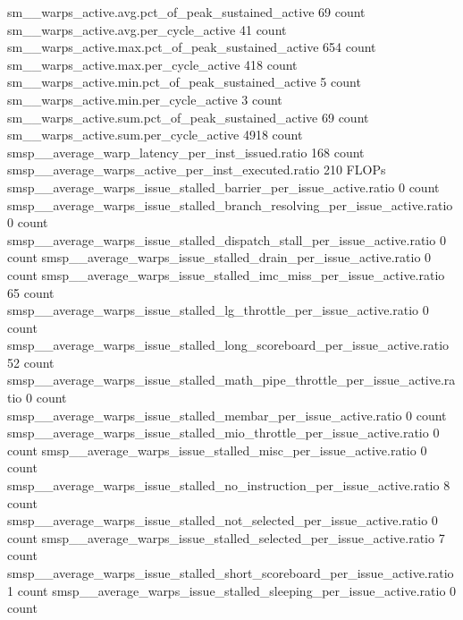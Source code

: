 sm__warps_active.avg.pct_of_peak_sustained_active                                             69 count
sm__warps_active.avg.per_cycle_active                                                         41 count
sm__warps_active.max.pct_of_peak_sustained_active                                            654 count
sm__warps_active.max.per_cycle_active                                                        418 count
sm__warps_active.min.pct_of_peak_sustained_active                                              5 count
sm__warps_active.min.per_cycle_active                                                          3 count
sm__warps_active.sum.pct_of_peak_sustained_active                                             69 count
sm__warps_active.sum.per_cycle_active                                                       4918 count
smsp__average_warp_latency_per_inst_issued.ratio                                             168 count
smsp__average_warps_active_per_inst_executed.ratio                                           210 FLOPs
smsp__average_warps_issue_stalled_barrier_per_issue_active.ratio                               0 count
smsp__average_warps_issue_stalled_branch_resolving_per_issue_active.ratio                      0 count
smsp__average_warps_issue_stalled_dispatch_stall_per_issue_active.ratio                        0 count
smsp__average_warps_issue_stalled_drain_per_issue_active.ratio                                 0 count
smsp__average_warps_issue_stalled_imc_miss_per_issue_active.ratio                             65 count
smsp__average_warps_issue_stalled_lg_throttle_per_issue_active.ratio                           0 count
smsp__average_warps_issue_stalled_long_scoreboard_per_issue_active.ratio                      52 count
smsp__average_warps_issue_stalled_math_pipe_throttle_per_issue_active.ratio                    0 count
smsp__average_warps_issue_stalled_membar_per_issue_active.ratio                                0 count
smsp__average_warps_issue_stalled_mio_throttle_per_issue_active.ratio                          0 count
smsp__average_warps_issue_stalled_misc_per_issue_active.ratio                                  0 count
smsp__average_warps_issue_stalled_no_instruction_per_issue_active.ratio                        8 count
smsp__average_warps_issue_stalled_not_selected_per_issue_active.ratio                          0 count
smsp__average_warps_issue_stalled_selected_per_issue_active.ratio                              7 count
smsp__average_warps_issue_stalled_short_scoreboard_per_issue_active.ratio                      1 count
smsp__average_warps_issue_stalled_sleeping_per_issue_active.ratio                              0 count
